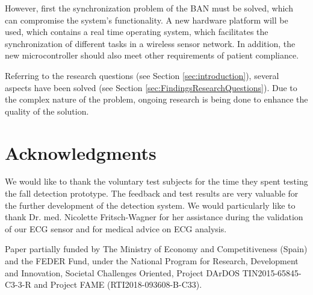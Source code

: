 \documentclass[10pt,journal,compsoc]{IEEEtran}
\begin{document}
However, first the synchronization problem of the BAN must be solved, which can compromise the system's functionality. A new hardware platform will be used, which contains a real time operating system, which facilitates the synchronization of different tasks in a wireless sensor network. In addition, the new microcontroller should also meet other requirements of patient compliance.

Referring to the research questions (see Section \ref{sec:introduction}), several aspects have been solved (see Section \ref{sec:FindingsResearchQuestions}). Due to the complex nature of the problem, ongoing research is being done to enhance the quality of the solution.

\section*{Acknowledgments}
We would like to thank the voluntary test subjects for the time they spent testing the fall detection prototype. The feedback and test results are very valuable for the further development of the detection system. We would particularly like to thank Dr. med. Nicolette Fritsch-Wagner for her assistance during the validation of our ECG sensor and for medical advice on ECG analysis. 

Paper partially funded by The Ministry of Economy and Competitiveness (Spain) and the FEDER Fund, under the National Program for Research, Development and Innovation, Societal Challenges Oriented, Project DArDOS TIN2015-65845-C3-3-R and Project FAME (RTI2018-093608-B-C33).


%
%
\end{document}
